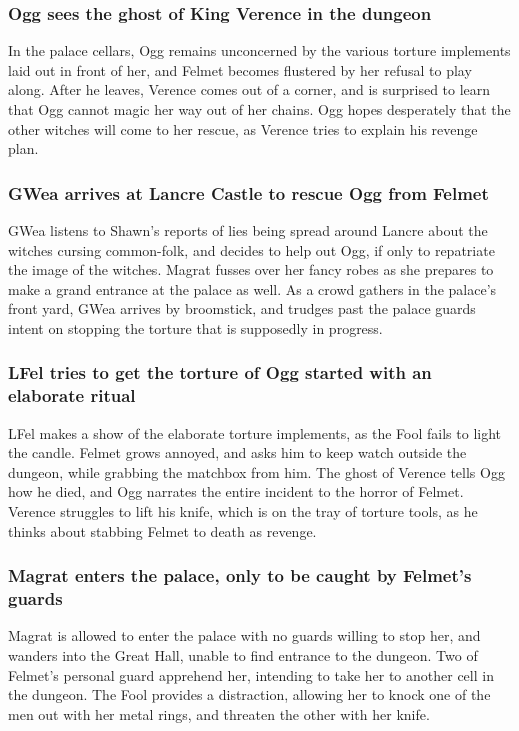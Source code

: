 \subsubsection{\Gls{Ogg} sees the ghost of King \Gls{Verence} in the dungeon}
In the palace cellars, \Gls{Ogg} remains unconcerned by the various torture implements laid out in
front of her, and \Gls{Felmet} becomes flustered by her refusal to play along. After he leaves,
\Gls{Verence} comes out of a corner, and is surprised to learn that \Gls{Ogg} cannot magic her way
out of her chains. \Gls{Ogg} hopes desperately that the other witches will come to her rescue, as
\Gls{Verence} tries to explain his revenge plan.

\subsubsection{\Gls{GWea} arrives at Lancre Castle to rescue \Gls{Ogg} from \Gls{Felmet}}
\Gls{GWea} listens to \Gls{Shawn}'s reports of lies being spread around Lancre about the witches
cursing common-folk, and decides to help out \Gls{Ogg}, if only to repatriate the image of the
witches. \Gls{Magrat} fusses over her fancy robes as she prepares to make a grand entrance at the
palace as well. As a crowd gathers in the palace's front yard, \Gls{GWea} arrives by broomstick,
and trudges past the palace guards intent on stopping the torture that is supposedly in progress.

\subsubsection{\Gls{LFel} tries to get the torture of \Gls{Ogg} started with an elaborate ritual}
\Gls{LFel} makes a show of the elaborate torture implements, as the \Gls{Fool} fails to light the
candle. \Gls{Felmet} grows annoyed, and asks him to keep watch outside the dungeon, while grabbing
the matchbox from him. The ghost of \Gls{Verence} tells \Gls{Ogg} how he died, and \Gls{Ogg}
narrates the entire incident to the horror of \Gls{Felmet}. \Gls{Verence} struggles to lift his
knife, which is on the tray of torture tools, as he thinks about stabbing \Gls{Felmet} to death as
revenge.

\subsubsection{\Gls{Magrat} enters the palace, only to be caught by \Gls{Felmet}'s guards}
\Gls{Magrat} is allowed to enter the palace with no guards willing to stop her, and wanders into the
Great Hall, unable to find entrance to the dungeon. Two of \Gls{Felmet}'s personal guard apprehend
her, intending to take her to another cell in the dungeon. The \Gls{Fool} provides a distraction,
allowing her to knock one of the men out with her metal rings, and threaten the other with her
knife.

